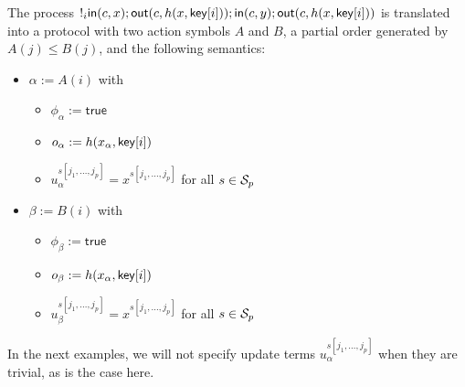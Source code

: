 \begin{example}
  The process $!_i
  \mathsf{in}(c,x);\mathsf{out}(c,h(x,\mathsf{key}[i]));\mathsf{in}(c,y);\mathsf{out}(c,h(x,\mathsf{key}[i]))$
  is translated into a protocol with two action symbols $A$ and $B$,
  a partial order generated by $A(j) \leq B(j)$, and the following
  semantics:
  \begin{itemize}
    \item $\alpha := A(i)$ with
      \begin{itemize}
        \item $\phi_\alpha := \mathsf{true}$
        \item $o_\alpha := h(x_\alpha,\mathsf{key}[i])$
        \item $u_\alpha^{s[j_1,\ldots,j_p]} = x^{s[j_1,\ldots,j_p]}$
          for all $s\in\mathcal{S}_p$
      \end{itemize}
    \item $\beta := B(i)$ with
      \begin{itemize}
        \item $\phi_\beta := \mathsf{true}$
        \item $o_\beta := h(x_\alpha,\mathsf{key}[i])$
        \item $u_\beta^{s[j_1,\ldots,j_p]} = x^{s[j_1,\ldots,j_p]}$
          for all $s\in\mathcal{S}_p$
      \end{itemize}
  \end{itemize}
  In the next examples, we will not specify update terms
  $u_\alpha^{s[j_1,\ldots,j_p]}$ when they are trivial, as is the case
  here.
\end{example}

